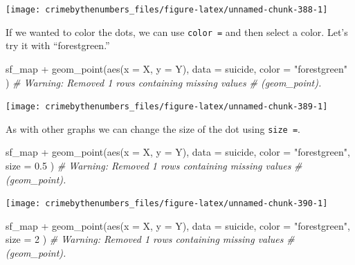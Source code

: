 \documentclass[
]{krantz}
\makeatletter
\newenvironment{Shaded}{\begin{snugshade}}{\end{snugshade}}
\newcommand{\AttributeTok}[1]{\textcolor[rgb]{0.61,0.61,0.61}{#1}}
\newcommand{\CommentTok}[1]{\textcolor[rgb]{0.37,0.37,0.37}{\textit{#1}}}
\newcommand{\DecValTok}[1]{\textcolor[rgb]{0.06,0.06,0.06}{#1}}
\newcommand{\FloatTok}[1]{\textcolor[rgb]{0.06,0.06,0.06}{#1}}
\newcommand{\FunctionTok}[1]{\textcolor[rgb]{0,0,0}{#1}}
\newcommand{\NormalTok}[1]{#1}
\newcommand{\SpecialCharTok}[1]{\textcolor[rgb]{0,0,0}{#1}}
\newcommand{\StringTok}[1]{\textcolor[rgb]{0.5,0.5,0.5}{#1}}
\newenvironment{kframe}{%
\medskip{}
\setlength{\fboxsep}{.8em}
 \def\at@end@of@kframe{}%
 \ifinner\ifhmode%
  \def\at@end@of@kframe{\end{minipage}}%
  \begin{minipage}{\columnwidth}%
 \fi\fi%
 \def\FrameCommand##1{\hskip\@totalleftmargin \hskip-\fboxsep
 \colorbox{shadecolor}{##1}\hskip-\fboxsep
     \hskip-\linewidth \hskip-\@totalleftmargin \hskip\columnwidth}%
 \MakeFramed {\advance\hsize-\width
   \@totalleftmargin\z@ \linewidth\hsize
   \@setminipage}}%
 {\par\unskip\endMakeFramed%
 \at@end@of@kframe}
\renewenvironment{Shaded}{\begin{kframe}}{\end{kframe}}
\makeatother
\begin{document}
\begin{center}\texttt{[image: crimebythenumbers\_files/figure-latex/unnamed-chunk-388-1]} \end{center}

If we wanted to color the dots, we can use \texttt{color\ =}
and then select a color. Let's try it with ``forestgreen.''

\begin{Shaded}
\begin{Highlighting}[]
\NormalTok{sf\_map }\SpecialCharTok{+}
  \FunctionTok{geom\_point}\NormalTok{(}\FunctionTok{aes}\NormalTok{(}\AttributeTok{x =}\NormalTok{ X, }\AttributeTok{y =}\NormalTok{ Y),}
    \AttributeTok{data  =}\NormalTok{ suicide,}
    \AttributeTok{color =} \StringTok{"forestgreen"}
\NormalTok{  )}
\CommentTok{\# Warning: Removed 1 rows containing missing values}
\CommentTok{\# (geom\_point).}
\end{Highlighting}
\end{Shaded}

\begin{center}\texttt{[image: crimebythenumbers\_files/figure-latex/unnamed-chunk-389-1]} \end{center}

As with other graphs we can change the size of the dot using
\texttt{size\ =}.

\begin{Shaded}
\begin{Highlighting}[]
\NormalTok{sf\_map }\SpecialCharTok{+}
  \FunctionTok{geom\_point}\NormalTok{(}\FunctionTok{aes}\NormalTok{(}\AttributeTok{x =}\NormalTok{ X, }\AttributeTok{y =}\NormalTok{ Y),}
    \AttributeTok{data  =}\NormalTok{ suicide,}
    \AttributeTok{color =} \StringTok{"forestgreen"}\NormalTok{,}
    \AttributeTok{size  =} \FloatTok{0.5}
\NormalTok{  )}
\CommentTok{\# Warning: Removed 1 rows containing missing values}
\CommentTok{\# (geom\_point).}
\end{Highlighting}
\end{Shaded}

\begin{center}\texttt{[image: crimebythenumbers\_files/figure-latex/unnamed-chunk-390-1]} \end{center}

\begin{Shaded}
\begin{Highlighting}[]
\NormalTok{sf\_map }\SpecialCharTok{+}
  \FunctionTok{geom\_point}\NormalTok{(}\FunctionTok{aes}\NormalTok{(}\AttributeTok{x =}\NormalTok{ X, }\AttributeTok{y =}\NormalTok{ Y),}
    \AttributeTok{data  =}\NormalTok{ suicide,}
    \AttributeTok{color =} \StringTok{"forestgreen"}\NormalTok{,}
    \AttributeTok{size  =} \DecValTok{2}
\NormalTok{  )}
\CommentTok{\# Warning: Removed 1 rows containing missing values}
\CommentTok{\# (geom\_point).}
\end{Highlighting}
\end{Shaded}
\end{document}
